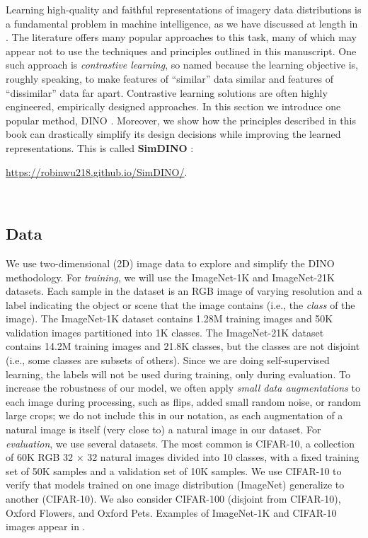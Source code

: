 \documentclass[../../book-main.tex]{subfiles}
\begin{document}
Learning high-quality and faithful representations of imagery data
distributions is a fundamental problem in machine intelligence, as we
have discussed at length in .
The literature offers many popular approaches to this task, many of
which may appear not to use the techniques and principles outlined in
this manuscript.
One such approach is \textit{contrastive learning},
so named because the learning objective is, roughly speaking, to make
features of ``similar'' data similar and features of ``dissimilar''
data far apart.
Contrastive learning solutions are often
highly engineered, empirically designed approaches. In this section
we introduce one popular method, DINO \citep{caron2021emerging}.
Moreover, we show how the principles described in this book can
drastically simplify its design decisions while improving the learned
representations.
This is called \textbf{SimDINO} \citep{wu2025simplifying}:
\\
\centerline{\url{https://robinwu218.github.io/SimDINO/}.}\\

\subsection{Data}\label{sub:contrastive_learning_data}
We use two-dimensional (2D) image data to explore and simplify the DINO
methodology.
For \textit{training},
we will use the ImageNet-1K and ImageNet-21K datasets. Each sample in the dataset is an RGB image of varying resolution and a label indicating the object or scene that the image contains (i.e., the \textit{class} of the image).
The ImageNet-1K dataset contains 1.28M training images and 50K validation images partitioned into 1K classes.
The ImageNet-21K dataset contains 14.2M training images and 21.8K classes, but the classes are not disjoint (i.e., some classes are subsets of others).
Since we are doing self-supervised learning, the labels will not be used during training, only during evaluation.
To increase the robustness of our model, we often apply \textit{small data augmentations} to each image during processing, such as flips, added small random noise, or random large crops;
we do not include this in our notation, as each augmentation of a natural image is itself (very close to) a natural image in our dataset.
For \textit{evaluation}, we use several datasets. The most common is CIFAR-10, a collection of 60K RGB 32 \(\times\) 32 natural images divided into 10 classes, with a fixed training set of 50K samples and a validation set of 10K samples.
We use CIFAR-10 to verify that models trained on one image distribution (ImageNet) generalize to another (CIFAR-10).
We also consider CIFAR-100 (disjoint from CIFAR-10), Oxford Flowers, and Oxford Pets.
Examples of ImageNet-1K and CIFAR-10 images appear in .
\end{document}
